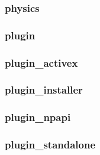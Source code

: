 \documentclass[a4paper]{article}
\begin{document}
\hypertarget{RefHeading18191167907073}{}\subsubsection{}
\clearpage\subsubsection[physics]{physics}
\hypertarget{RefHeading18211167907073}{}\subsubsection{}
\clearpage\subsubsection[plugin]{plugin}
\hypertarget{RefHeading18231167907073}{}\subsubsection{}
\clearpage\subsubsection[plugin\_activex]{plugin\_activex}
\hypertarget{RefHeading18251167907073}{}\subsubsection{}
\clearpage\subsubsection[plugin\_installer]{plugin\_installer}
\hypertarget{RefHeading18271167907073}{}\subsubsection{}
\clearpage\subsubsection[plugin\_npapi]{plugin\_npapi}
\hypertarget{RefHeading18291167907073}{}\subsubsection{}
\clearpage\subsubsection[plugin\_standalone]{plugin\_standalone}
\hypertarget{RefHeading18311167907073}{}\subsubsection{}
\end{document}
